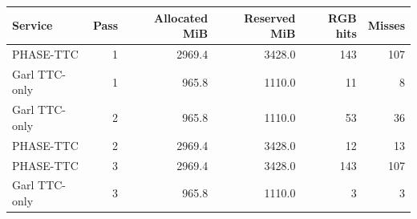 \begin{tabular}{lrrrrr}
\toprule
Service & Pass & Allocated MiB & Reserved MiB & RGB hits & Misses \\
\midrule
PHASE-TTC & 1 & 2969.4 & 3428.0 & 143 & 107 \\
Garl TTC-only & 1 & 965.8 & 1110.0 & 11 & 8 \\
Garl TTC-only & 2 & 965.8 & 1110.0 & 53 & 36 \\
PHASE-TTC & 2 & 2969.4 & 3428.0 & 12 & 13 \\
PHASE-TTC & 3 & 2969.4 & 3428.0 & 143 & 107 \\
Garl TTC-only & 3 & 965.8 & 1110.0 & 3 & 3 \\
\bottomrule
\end{tabular}
